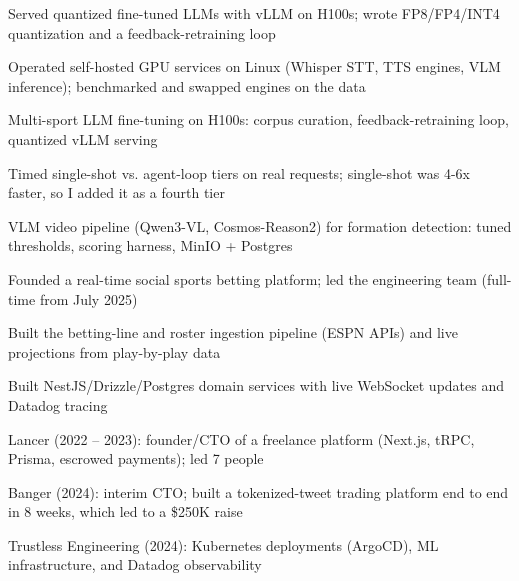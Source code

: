 \documentclass[print]{jack-resume}
\begin{document}
\begin{tightemize}
    \item Served quantized fine-tuned LLMs with vLLM on H100s; wrote FP8/FP4/INT4 quantization and a feedback-retraining loop
    \item Operated self-hosted GPU services on Linux (Whisper STT, TTS engines, VLM inference); benchmarked and swapped engines on the data
    \item Multi-sport LLM fine-tuning on H100s: corpus curation, feedback-retraining loop, quantized vLLM serving
    \item Timed single-shot vs. agent-loop tiers on real requests; single-shot was 4-6x faster, so I added it as a fourth tier
    \item VLM video pipeline (Qwen3-VL, Cosmos-Reason2) for formation detection: tuned thresholds, scoring harness, MinIO + Postgres
\end{tightemize}
\sectionsep

\begin{tightemize}
    \item Founded a real-time social sports betting platform; led the engineering team (full-time from July 2025)
    \item Built the betting-line and roster ingestion pipeline (ESPN APIs) and live projections from play-by-play data
    \item Built NestJS/Drizzle/Postgres domain services with live WebSocket updates and Datadog tracing
\end{tightemize}
\sectionsep

\begin{tightemize}
    \item Lancer (2022 -- 2023): founder/CTO of a freelance platform (Next.js, tRPC, Prisma, escrowed payments); led 7 people
    \item Banger (2024): interim CTO; built a tokenized-tweet trading platform end to end in 8 weeks, which led to a \$250K raise
    \item Trustless Engineering (2024): Kubernetes deployments (ArgoCD), ML infrastructure, and Datadog observability
\end{tightemize}
\sectionsep
\end{document}
